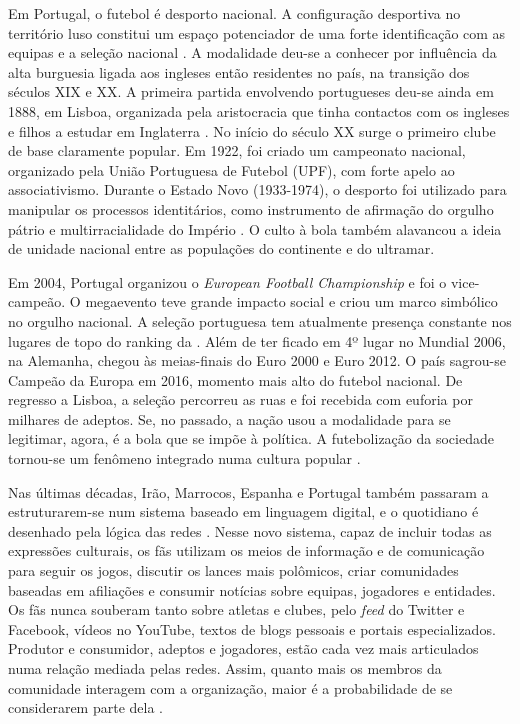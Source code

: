 \documentclass{textolivre}
\begin{document}
Em Portugal, o futebol é desporto nacional. A configuração desportiva no território luso constitui um espaço potenciador de uma forte identificação com as equipas e a seleção nacional \cite{marivoet2006}. A modalidade deu-se a conhecer por influência da alta burguesia ligada aos ingleses então residentes no país, na transição dos séculos XIX e XX. A primeira partida envolvendo portugueses deu-se ainda em 1888, em Lisboa, organizada pela aristocracia que tinha contactos com os ingleses e filhos a estudar em Inglaterra \cite{pinheiro2002}. No início do século XX surge o primeiro clube de base claramente popular. Em 1922, foi criado um campeonato nacional, organizado pela União Portuguesa de Futebol (UPF), com forte apelo ao associativismo. Durante o Estado Novo (1933-1974), o desporto foi utilizado para manipular os processos identitários, como instrumento de afirmação do orgulho pátrio e multirracialidade do Império \cite{domingos2006}. O culto à bola também alavancou a ideia de unidade nacional entre as populações do continente e do ultramar.

Em 2004, Portugal organizou o \emph{European Football Championship} e foi o vice-campeão. O megaevento teve grande impacto social e criou um marco simbólico no orgulho nacional. A seleção portuguesa tem atualmente presença constante nos lugares de topo do ranking da \textcite{fifa2021}. Além de ter ficado em 4º lugar no Mundial 2006, na Alemanha, chegou às meias-finais do Euro 2000 e Euro 2012. O país sagrou-se Campeão da Europa em 2016, momento mais alto do futebol nacional. De regresso a Lisboa, a seleção percorreu as ruas e foi recebida com euforia por milhares de adeptos. Se, no passado, a nação usou a modalidade para se legitimar, agora, é a bola que se impõe à política. A futebolização da sociedade tornou-se um fenômeno integrado numa cultura popular \cite{pinheiro2002}.

Nas últimas décadas, Irão, Marrocos, Espanha e Portugal também passaram a estruturarem-se num sistema baseado em linguagem digital, e o quotidiano é desenhado pela lógica das redes \cite{castells2007}. Nesse novo sistema, capaz de incluir todas as expressões culturais, os fãs utilizam os meios de informação e de comunicação para seguir os jogos, discutir os lances mais polômicos, criar comunidades baseadas em afiliações e consumir notícias sobre equipas, jogadores e entidades. Os fãs nunca souberam tanto sobre atletas e clubes, pelo \emph{feed} do Twitter e Facebook, vídeos no YouTube, textos de blogs pessoais e portais especializados. Produtor e consumidor, adeptos e jogadores, estão cada vez mais articulados numa relação mediada pelas redes. Assim, quanto mais os membros da comunidade interagem com a organização, maior é a probabilidade de se considerarem parte dela \cite{ahn2014, williams2012}.
\end{document}
